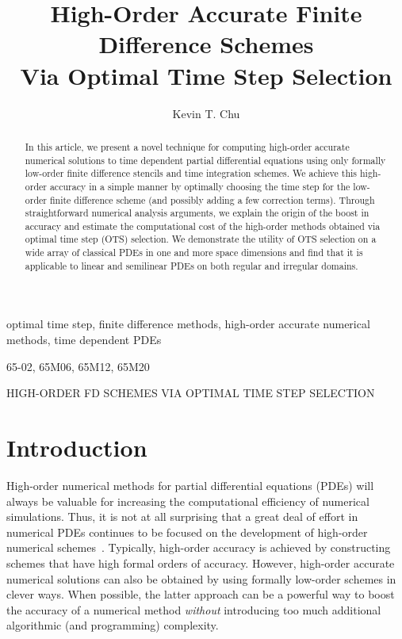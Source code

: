 \documentclass[oneeqnum,onefignum,onetabnum,onethmnum]{siamltex}
\title{High-Order Accurate Finite Difference Schemes \\
       Via Optimal Time Step Selection}
\author{
Kevin T. Chu\footnotemark[2] \footnotemark[3]
}
\begin{document}

\maketitle

\renewcommand{\thefootnote}{\fnsymbol{footnote}}

\renewcommand{\thefootnote}{\fnsymbol{footnote}}

\renewcommand{\thefootnote}{\arabic{footnote}}


\begin{abstract}
In this article, we present a novel technique for computing high-order
accurate numerical solutions to time dependent partial differential 
equations using only formally low-order finite difference stencils and
time integration schemes.  We achieve this high-order accuracy in a simple 
manner by optimally choosing the time step for the low-order finite 
difference scheme (and possibly adding a few correction terms).  Through 
straightforward numerical analysis arguments, we explain the origin of the 
boost in accuracy and estimate the computational cost of the high-order 
methods obtained via optimal time step (OTS) selection.  We demonstrate the 
utility of OTS selection on a wide array of classical PDEs in one and more 
space dimensions and find that it is applicable to linear and semilinear PDEs 
on both regular and irregular domains. 
\end{abstract}


\begin{keywords}
optimal time step, finite difference methods, high-order accurate numerical 
methods, time dependent PDEs
\end{keywords}

\begin{AMS}
65-02, 65M06, 65M12, 65M20
\end{AMS}

\pagestyle{myheadings}
\thispagestyle{plain}
         {HIGH-ORDER FD SCHEMES VIA OPTIMAL TIME STEP SELECTION} 


\section*{Introduction}
High-order numerical methods for partial differential equations (PDEs) will 
always be valuable for increasing the computational efficiency of numerical 
simulations.  Thus, it is not at all surprising that a great deal of effort in 
numerical PDEs continues to be focused on the development of high-order 
numerical schemes~\cite{bruger_2005, gibou_2005, ito_2005, shukla_2005, 
shukla_2007}.  
Typically, high-order accuracy is achieved by constructing
schemes that have high formal orders of accuracy.  However, high-order 
accurate numerical solutions can also be obtained by using formally low-order 
schemes in clever ways.  When possible, the latter approach can be a powerful 
way to boost the accuracy of a numerical method \emph{without} introducing too 
much additional algorithmic (and programming) complexity.
\end{document}

